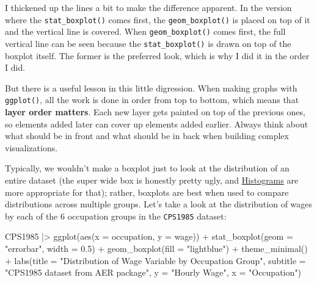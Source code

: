 \documentclass[
  letterpaper,
]{book}
\newenvironment{Shaded}{\begin{snugshade}}{\end{snugshade}}
\newcommand{\AttributeTok}[1]{\textcolor[rgb]{0.40,0.45,0.13}{#1}}
\newcommand{\FloatTok}[1]{\textcolor[rgb]{0.68,0.00,0.00}{#1}}
\newcommand{\FunctionTok}[1]{\textcolor[rgb]{0.28,0.35,0.67}{#1}}
\newcommand{\NormalTok}[1]{\textcolor[rgb]{0.00,0.23,0.31}{#1}}
\newcommand{\SpecialCharTok}[1]{\textcolor[rgb]{0.37,0.37,0.37}{#1}}
\newcommand{\StringTok}[1]{\textcolor[rgb]{0.13,0.47,0.30}{#1}}
\begin{document}
\begin{tcolorbox}
\begin{figure}[H]
\begin{minipage}{0.50\linewidth}
\begin{figure}[H]
{}


\end{figure}%

\end{minipage}%

\end{figure}%

I thickened up the lines a bit to make the difference apparent. In the
version where the \texttt{stat\_boxplot()} comes first, the
\texttt{geom\_boxplot()} is placed on top of it and the vertical line is
covered. When \texttt{geom\_boxplot()} comes first, the full vertical
line can be seen because the \texttt{stat\_boxplot()} is drawn on top of
the boxplot itself. The former is the preferred look, which is why I did
it in the order I did.

But there is a useful lesson in this little digression. When making
graphs with \texttt{ggplot()}, all the work is done in order from top to
bottom, which means that \textbf{layer order matters}. Each new layer
gets painted on top of the previous ones, so elements added later can
cover up elements added earlier. Always think about what should be in
front and what should be in back when building complex visualizations.

\end{tcolorbox}

Typically, we wouldn't make a boxplot just to look at the distribution
of an entire dataset (the super wide box is honestly pretty ugly, and
\hyperref[histograms]{Histograms} are more appropriate for that);
rather, boxplots are best when used to compare distributions across
multiple groups. Let's take a look at the distribution of wages by each
of the 6 occupation groups in the \texttt{CPS1985} dataset:

\begin{Shaded}
\begin{Highlighting}[]
\NormalTok{CPS1985 }\SpecialCharTok{|\textgreater{}} 
  \FunctionTok{ggplot}\NormalTok{(}\FunctionTok{aes}\NormalTok{(}\AttributeTok{x =}\NormalTok{ occupation, }\AttributeTok{y =}\NormalTok{ wage)) }\SpecialCharTok{+}
  \FunctionTok{stat\_boxplot}\NormalTok{(}\AttributeTok{geom =} \StringTok{"errorbar"}\NormalTok{, }\AttributeTok{width =} \FloatTok{0.5}\NormalTok{) }\SpecialCharTok{+} 
  \FunctionTok{geom\_boxplot}\NormalTok{(}\AttributeTok{fill =} \StringTok{"lightblue"}\NormalTok{) }\SpecialCharTok{+}
  \FunctionTok{theme\_minimal}\NormalTok{() }\SpecialCharTok{+}
  \FunctionTok{labs}\NormalTok{(}\AttributeTok{title =} \StringTok{"Distribution of Wage Variable by Occupation Group"}\NormalTok{,}
       \AttributeTok{subtitle =} \StringTok{"CPS1985 dataset from AER package"}\NormalTok{,}
       \AttributeTok{y =} \StringTok{"Hourly Wage"}\NormalTok{,}
       \AttributeTok{x =} \StringTok{"Occupation"}\NormalTok{)}
\end{Highlighting}
\end{Shaded}
\end{document}
